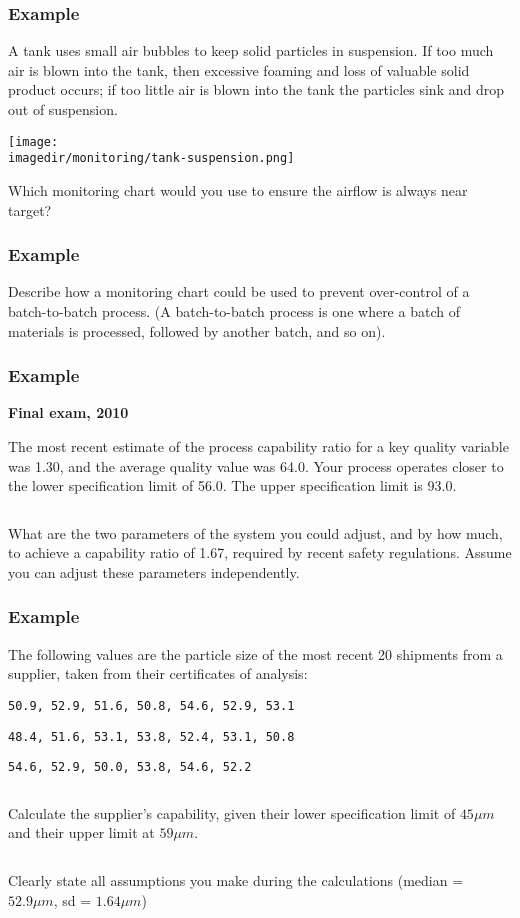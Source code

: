 \begin{frame}\frametitle{Example}
	
	A tank uses small air bubbles to keep solid particles in suspension. If too much air is blown into the tank, then excessive foaming and loss of valuable solid product occurs; if too little air is blown into the tank the particles sink and drop out of suspension.
	
	\texttt{[image: \\imagedir/monitoring/tank-suspension.png]}
	
	Which monitoring chart would you use to ensure the airflow is always near target?
\end{frame}

\begin{frame}\frametitle{Example}
	
	Describe how a monitoring chart could be used to prevent over-control of a batch-to-batch process. (A batch-to-batch process is one where a batch of materials is processed, followed by another batch, and so on).
\end{frame}

\begin{frame}\frametitle{Example}
	
	\textbf{Final exam, 2010}
	
	The most recent estimate of the process capability ratio for a key quality variable was 1.30, and the average quality value was 64.0. Your process operates closer to the lower specification limit of 56.0. The upper specification limit is 93.0.
	
	$\quad$
	
	What are the two parameters of the system you could adjust, and by how much, to achieve a capability ratio of 1.67, required by recent safety regulations. Assume you can adjust these parameters independently.
\end{frame}

\begin{frame}\frametitle{Example}
	
	The following values are the particle size of the most recent 20 shipments from a supplier, taken from their certificates of analysis:
	
	\texttt{50.9, 52.9, 51.6, 50.8, 54.6, 52.9, 53.1 }
	
	\texttt{48.4, 51.6, 53.1, 53.8, 52.4, 53.1, 50.8}
	
	\texttt{54.6, 52.9, 50.0, 53.8, 54.6, 52.2}
	
	$\qquad$
	
	Calculate the supplier's capability, given their lower specification limit of $45 \mu m$ and their upper limit at $59 \mu m$.
	
	$\qquad$
	
	Clearly state all assumptions you make during the calculations (median = $52.9 \mu m$, sd = $1.64 \mu m$)
\end{frame}

